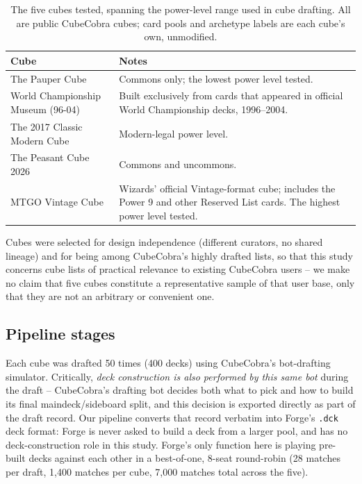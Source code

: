 \documentclass[11pt]{article}
\begin{document}
\begin{table}[h]
\centering
\caption{The five cubes tested, spanning the power-level range used in cube
drafting. All are public CubeCobra cubes; card pools and archetype labels are each
cube's own, unmodified.}
\begin{tabular}{lp{9cm}}
\toprule
Cube & Notes \\
\midrule
The Pauper Cube & Commons only; the lowest power level tested. \\
World Championship Museum (96-04) & Built exclusively from cards that appeared in
official World Championship decks, 1996--2004. \\
The 2017 Classic Modern Cube & Modern-legal power level. \\
The Peasant Cube 2026 & Commons and uncommons. \\
MTGO Vintage Cube & Wizards' official Vintage-format cube; includes the Power 9
and other Reserved List cards. The highest power level tested. \\
\bottomrule
\end{tabular}
\end{table}

Cubes were selected for design independence (different curators, no shared
lineage) and for being among CubeCobra's highly drafted lists, so that this
study concerns cube lists of practical relevance to existing CubeCobra users --
we make no claim that five cubes constitute a representative sample of that
user base, only that they are not an arbitrary or convenient one.

\subsection{Pipeline stages}

Each cube was drafted 50 times (400 decks) using CubeCobra's bot-drafting
simulator. Critically, \emph{deck construction is also performed by this same
bot} during the draft -- CubeCobra's drafting bot decides both what to pick and
how to build its final maindeck/sideboard split, and this decision is exported
directly as part of the draft record. Our pipeline converts that record verbatim
into Forge's \texttt{.dck} deck format: Forge is never asked to build a deck from
a larger pool, and has no deck-construction role in this study. Forge's only
function here is playing pre-built decks against each other in a best-of-one,
8-seat round-robin (28 matches per draft, 1{,}400 matches per cube, 7{,}000
matches total across the five).
\end{document}
